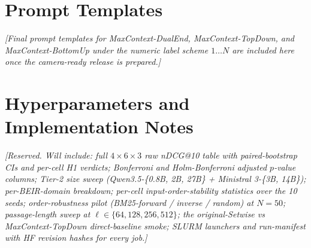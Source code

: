 \section{Prompt Templates}
\label{sec:prompts}

\textit{[Final prompt templates for MaxContext-DualEnd, MaxContext-TopDown,
and MaxContext-BottomUp under the numeric label scheme $1 \dots N$ are
included here once the camera-ready release is prepared.]}

\section{Hyperparameters and Implementation Notes}
\label{sec:hparams}

\textit{[Reserved. Will include: full $4 \times 6 \times 3$ raw nDCG@10
table with paired-bootstrap CIs and per-cell H1 verdicts; Bonferroni and
Holm-Bonferroni adjusted $p$-value columns; Tier-2 size sweep
(Qwen3.5-\{0.8B, 2B, 27B\} + Ministral 3-\{3B, 14B\}); per-BEIR-domain
breakdown; per-cell input-order-stability statistics over the 10
seeds; order-robustness pilot (BM25-forward / inverse / random) at
$N{=}50$; passage-length sweep at $\ell \in \{64, 128, 256, 512\}$; the
original-Setwise vs MaxContext-TopDown direct-baseline smoke; SLURM
launchers and run-manifest with HF revision hashes for every job.]}
